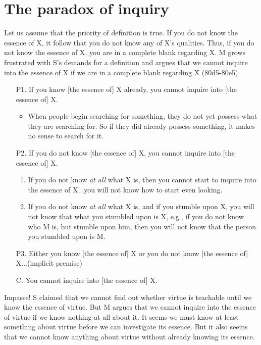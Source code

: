 \documentclass[10 pt]{article}
\begin{document}
\section*{The paradox of inquiry}
Let us assume that the priority of definition is true. If you do not know the essence of  X, it follow that you do not know any of X's qualities. Thus, if you do not know the essence of X, you are in a complete blank regarding X. M grows frustrated with S's demands for a definition and argues that we cannot inquire into the essence of X if we are in a complete blank regarding X (80d5-80e5). 

\begin{enumerate}
\item[P1.] If you know [the essence of] X already, you cannot inquire into [the essence of] X. 
\begin{itemize}
\item When people begin searching for something, they do not yet possess what they are searching for. So if they did already possess something, it makes no sense to search for it.
\end{itemize}
\item[P2.] If you do not know [the essence of] X, you cannot inquire into [the essence of] X.\begin{enumerate}
\item If you do not know \emph{at all} what X is, then you cannot start to inquire into the essence of X...you will not know how to start even looking.
\item If you do not know \emph{at all} what X is, and if you stumble upon X, you will not know that what you stumbled upon is X, e.g., if you do not know who M is, but stumble upon him, then you will not know that the person you stumbled upon is M. 
\end{enumerate}
\item[P3.] Either you know [the essence of]  X or you do not know [the essence of] X...(implicit premise) 
\item[C.] You cannot inquire into [the essence of] X.
\end{enumerate}
Impasse!  S claimed that we cannot find out whether virtue is teachable until we know the essence of virtue.  But M argues that we cannot inquire into the essence of virtue if we know nothing at all about it. It seems we must know at least something about virtue before we can investigate its essence. But it also seems that we cannot know anything about virtue without already knowing its essence.  
\end{document}
